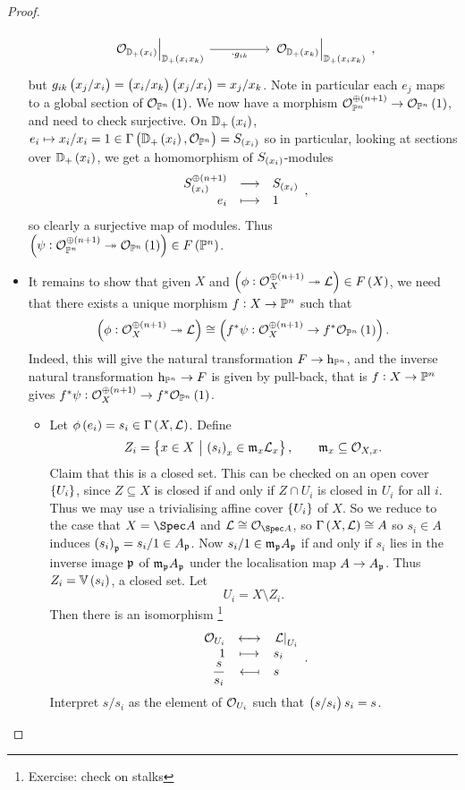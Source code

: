 \begin{proof}
\begin{itemize}
$$\begin{tikzcd}
\eval{\OOO_{\DD_+\br{x_i}}}_{\DD_+\br{x_ix_k}} \arrow{rr}[swap]{\cdot g_{ik}} & & \eval{\OOO_{\DD_+\br{x_k}}}_{\DD_+\br{x_ix_k}}
\end{tikzcd},
$$
but $ g_{ik}\br{x_j / x_i} = \br{x_i / x_k}\br{x_j / x_i} = x_j / x_k $. Note in particular each $ e_j $ maps to a global section of $ \OOO_{\PP^n}\br{1} $. We now have a morphism $ \OOO_{\PP^n}^{\oplus \br{n + 1}} \to \OOO_{\PP^n}\br{1} $, and need to check surjective. On $ \DD_+\br{x_i} $, $ e_i \mapsto x_i / x_i = 1 \in \Gamma\br{\DD_+\br{x_i}, \OOO_{\PP^n}} = S_{\br{x_i}} $ so in particular, looking at sections over $ \DD_+\br{x_i} $, we get a homomorphism of $ S_{\br{x_i}} $-modules
$$ \function{S_{\br{x_i}}^{\oplus \br{n + 1}}}{S_{\br{x_i}}}{e_i}{1}, $$
so clearly a surjective map of modules. Thus $ \br{\psi : \OOO_{\PP^n}^{\oplus \br{n + 1}} \twoheadrightarrow \OOO_{\PP^n}\br{1}} \in F\br{\PP^n} $.

\pagebreak

\item It remains to show that given $ X $ and $ \br{\phi : \OOO_X^{\oplus \br{n + 1}} \twoheadrightarrow \LLL} \in F\br{X} $, we need that there exists a unique morphism $ f : X \to \mathbb{P}^n $ such that
$$ \br{\phi : \OOO_X^{\oplus \br{n + 1}} \twoheadrightarrow \LLL} \cong \br{f^*\psi : \OOO_X^{\oplus \br{n + 1}} \to f^*\OOO_{\PP^n}\br{1}}. $$
Indeed, this will give the natural transformation $ F \to \mathrm{h}_{\mathbb{P}^n} $, and the inverse natural transformation $ \mathrm{h}_{\mathbb{P}^n} \to F $ is given by pull-back, that is $ f : X \to \mathbb{P}^n $ gives $ f^*\psi : \OOO_X^{\oplus \br{n + 1}} \to f^*\OOO_{\PP^n}\br{1} $.
\begin{itemize}
\item Let $ \phi\br{e_i} = s_i \in \Gamma\br{X, \LLL} $. Define
$$ Z_i = \cbr{x \in X \st \br{s_i}_x \in \mmm_x\LLL_x}, \qquad \mmm_x \subseteq \OOO_{X, x}. $$
Claim that this is a closed set. This can be checked on an open cover $ \cbr{U_i} $, since $ Z \subseteq X $ is closed if and only if $ Z \cap U_i $ is closed in $ U_i $ for all $ i $. Thus we may use a trivialising affine cover $ \cbr{U_i} $ of $ X $. So we reduce to the case that $ X = \Spec A $ and $ \LLL \cong \OOO_{\Spec A} $, so $ \Gamma\br{X, \LLL} \cong A $ so $ s_i \in A $ induces $ \br{s_i}_\ppp = s_i / 1 \in A_\ppp $. Now $ s_i / 1 \in \mathfrak{m}_{\mathfrak{p}} A_{\mathfrak{p}} $ if and only if $ s_i $ lies in the inverse image $ \mathfrak{p} $ of $ \mathfrak{m}_{\mathfrak{p}} A_{\mathfrak{p}} $ under the localisation map $ A \to A_{\mathfrak{p}} $. Thus $ Z_i = \VV\br{s_i} $, a closed set. Let
$$ U_i = X \setminus Z_i. $$
Then there is an isomorphism \footnote{Exercise: check on stalks}
$$ \bijection{\OOO_{U_i}}{\eval{\LLL}_{U_i}}{1}{s_i}{\dfrac{s}{s_i}}{s}. $$
Interpret $ s / s_i $ as the element of $ \mathcal{O}_{U_i} $ such that $ \br{s / s_i}s_i = s $.


\end{itemize}
\end{itemize}
\end{proof}

